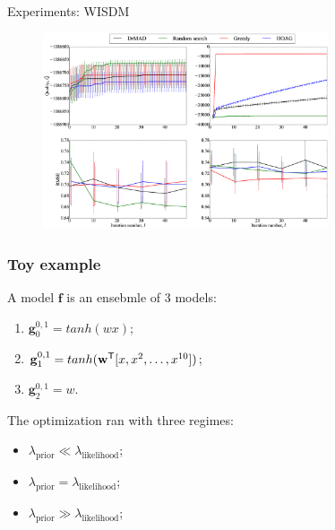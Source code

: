 \documentclass[usenames,dvipsnames,11pt,pdf,utf8,russian,aspectratio=169]{beamer}
\begin{document}
\begin{frame}{Experiments: WISDM}
\begin{figure}  
\includegraphics[width=0.75\textwidth]{Fig_wisdm.eps}
\end{figure}
\end{frame}










\begin{frame}[noframenumbering]
\frametitle{Toy example}
A model $\mathbf{f}$ is an ensebmle of 3 models:
\begin{enumerate}
\item $\mathbf{g}^{0,1}_0 = {tanh}(wx)$;
\item $\mathbf{g}^{0,1}_1 = {tanh}(\mathbf{w}^\mathsf{T} [x, x^2, \dots, x^{10}])$;
\item $\mathbf{g}^{0,1}_2 = {w}$.
\end{enumerate}

The optimization ran with three regimes:
\begin{itemize}
\item $\lambda_\text{prior} \ll \lambda_\text{likelihood}$; 
\item $\lambda_\text{prior} = \lambda_\text{likelihood}$;
\item $\lambda_\text{prior} \gg \lambda_\text{likelihood}$;
\end{itemize}


\end{frame}
\end{document}
